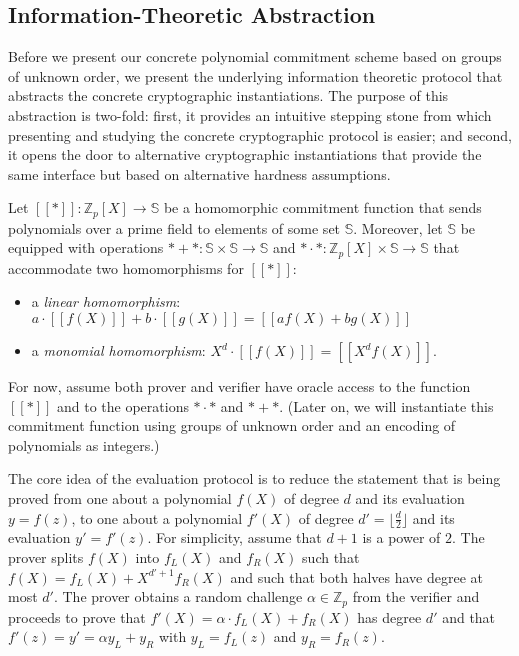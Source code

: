 \subsection{Information-Theoretic Abstraction}
\label{sec:abstraction}


Before we present our concrete polynomial commitment scheme based on groups of unknown order, we present the underlying information theoretic protocol that abstracts the concrete cryptographic instantiations. 
The purpose of this abstraction is two-fold: first, it provides an intuitive stepping stone from which presenting and studying the concrete cryptographic protocol is easier; and second, it opens the door to alternative cryptographic instantiations that provide the same interface but based on alternative hardness assumptions. %

Let $[\![ * ]\!] : \mathbb{Z}_p[X] \rightarrow \mathbb{S}$ be a homomorphic commitment function that sends polynomials over a prime field to elements of some set $\mathbb{S}$. Moreover, let $\mathbb{S}$ be equipped with operations $* + * : \mathbb{S} \times \mathbb{S} \rightarrow \mathbb{S}$ and $ * \cdot * : \mathbb{Z}_p[X] \times \mathbb{S} \rightarrow \mathbb{S}$ that accommodate two homomorphisms for $[\![ * ]\!]$:
\begin{itemize}[nolistsep]
    \item a \emph{linear homomorphism}: $a \cdot [\![f(X)]\!] + b \cdot [\![g(X)]\!] = [\![af(X) + bg(X)]\!]$
    \item a \emph{monomial homomorphism}: $X^d \cdot [\![f(X)]\!] = [\![X^d f(X)]\!]$.
\end{itemize}
For now, assume both prover and verifier have oracle access to the function $[\![*]\!]$ and to the operations $ * \cdot *$ and $* + *$. (Later on, we will instantiate this commitment function using groups of unknown order and an encoding of polynomials as integers.)

The core idea of the evaluation protocol is to reduce the statement that is being proved from one about a polynomial $f(X)$ of degree $d$ and its evaluation $y = f(z)$, to one about a polynomial $f'(X)$ of degree $d'=\lfloor\frac{d}{2}\rfloor$ and its evaluation $y' = f'(z)$. For simplicity, assume that $d+1$ is a power of $2$.
The prover splits $f(X)$ into $f_L(X)$ and $f_R(X)$ such that $f(X) = f_L(X) + X^{d'+1} f_R(X)$ and such that both halves have degree at most $d'$. The prover obtains a random challenge $\alpha \in  \mathbb{Z}_p$ from the verifier and proceeds to prove that $f'(X)=\alpha \cdot f_L(X) + f_R(X)$ has degree $d'$ and that $f'(z) = y' = \alpha y_L + y_R$ with $y_L = f_L(z)$ and $y_R = f_R(z)$. 

